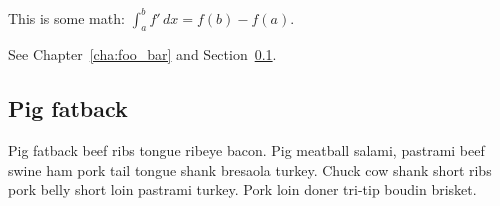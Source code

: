 This is some math: $\int_a^b f'\,dx = f(b) - f(a)$.

See Chapter~\ref{cha:foo_bar} and Section~\ref{sec:pig_fatback}.

\subsection{Pig fatback}
\label{sec:pig_fatback}

Pig fatback beef ribs tongue ribeye bacon. Pig meatball salami, pastrami beef swine ham pork tail tongue shank bresaola turkey. Chuck cow shank short ribs pork belly short loin pastrami turkey. Pork loin doner tri-tip boudin brisket.
